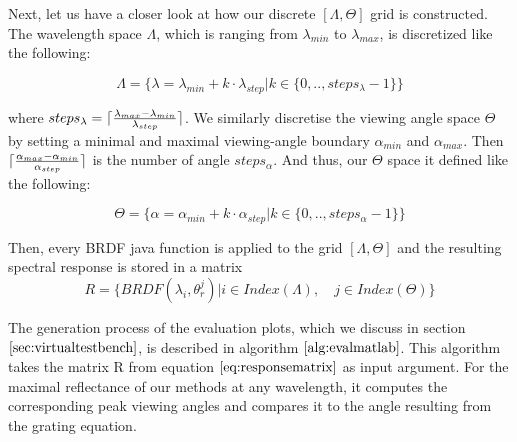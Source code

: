 Next, let us have a closer look at how our discrete $[\Lambda, \Theta]$ grid is constructed. The wavelength space $\Lambda$, which is ranging from $\lambda_{min}$ to $\lambda_{max}$, is discretized like the following:

\begin{equation}
\Lambda = \{\lambda = \lambda_{min} + k \cdot \lambda_{step} | k \in \{0,..,steps_{\lambda}-1\}\}
\label{eq:lambdaspacesetup}
\end{equation}

where $steps_{\lambda} = \lceil\frac{\lambda_{max}-\lambda_{min}}{\lambda_{step}}\rceil$. We similarly discretise the viewing angle space $\Theta$ by setting a minimal and maximal viewing-angle boundary $\alpha_{min}$ and $\alpha_{max}$. Then $\lceil\frac{\alpha_{max} - \alpha_{min}}{\alpha_{step}}\rceil$ is the number of angle $steps_{\alpha}$. And thus, our $\Theta$ space it defined like the following:

\begin{equation}
\Theta = \{\alpha = \alpha_{min} + k \cdot \alpha_{step} | k \in \{0,..,steps_{\alpha}-1\}\}
\label{eq:thetaspacesetup}
\end{equation}

Then, every BRDF java function is applied to the grid $[\Lambda, \Theta]$ and the resulting spectral response is stored in a matrix
\begin{equation} 
R = \{BRDF(\lambda_i, \theta_{r}^{j}) | i \in Index(\Lambda), \quad j \in Index(\Theta)\}
\label{eq:responsematrix}
\end{equation}

The generation process of the evaluation plots, which we discuss in section $\ref{sec:virtualtestbench}$, is described in algorithm $\ref{alg:evalmatlab}$. This algorithm takes the matrix R from equation $\ref{eq:responsematrix}$ as input argument. For the maximal reflectance of our methods at any wavelength, it computes the corresponding peak viewing angles and compares it to the angle resulting from the grating equation.


